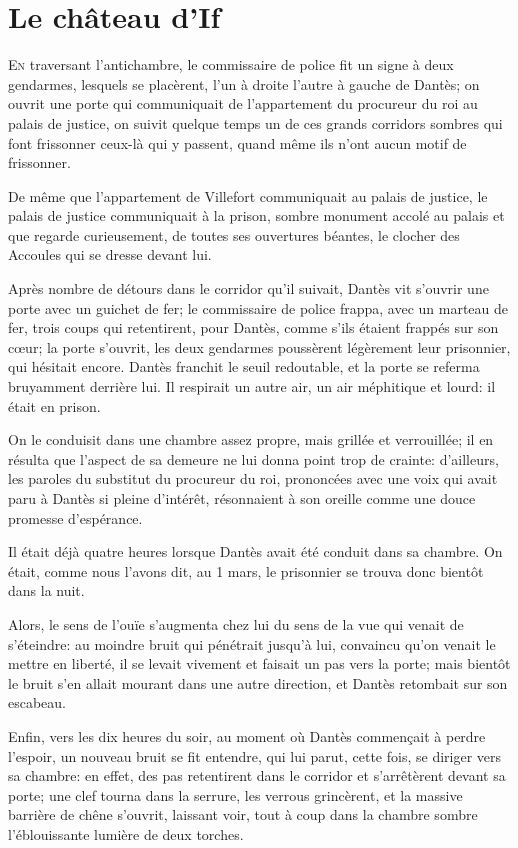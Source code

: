 \chapter{Le château d'If}

\lettrine{E}{n} traversant l'antichambre, le commissaire de police fit un signe à deux gendarmes, lesquels se placèrent, l'un à droite l'autre à gauche de Dantès; on ouvrit une porte qui communiquait de l'appartement du procureur du roi au palais de justice, on suivit quelque temps un de ces grands corridors sombres qui font frissonner ceux-là qui y passent, quand même ils n'ont aucun motif de frissonner.

De même que l'appartement de Villefort communiquait au palais de justice, le palais de justice communiquait à la prison, sombre monument accolé au palais et que regarde curieusement, de toutes ses ouvertures béantes, le clocher des Accoules qui se dresse devant lui.

Après nombre de détours dans le corridor qu'il suivait, Dantès vit s'ouvrir une porte avec un guichet de fer; le commissaire de police frappa, avec un marteau de fer, trois coups qui retentirent, pour Dantès, comme s'ils étaient frappés sur son cœur; la porte s'ouvrit, les deux gendarmes poussèrent légèrement leur prisonnier, qui hésitait encore. Dantès franchit le seuil redoutable, et la porte se referma bruyamment derrière lui. Il respirait un autre air, un air méphitique et lourd: il était en prison.

On le conduisit dans une chambre assez propre, mais grillée et verrouillée; il en résulta que l'aspect de sa demeure ne lui donna point trop de crainte: d'ailleurs, les paroles du substitut du procureur du roi, prononcées avec une voix qui avait paru à Dantès si pleine d'intérêt, résonnaient à son oreille comme une douce promesse d'espérance.

Il était déjà quatre heures lorsque Dantès avait été conduit dans sa chambre. On était, comme nous l'avons dit, au 1\ier{} mars, le prisonnier se trouva donc bientôt dans la nuit.

Alors, le sens de l'ouïe s'augmenta chez lui du sens de la vue qui venait de s'éteindre: au moindre bruit qui pénétrait jusqu'à lui, convaincu qu'on venait le mettre en liberté, il se levait vivement et faisait un pas vers la porte; mais bientôt le bruit s'en allait mourant dans une autre direction, et Dantès retombait sur son escabeau.

Enfin, vers les dix heures du soir, au moment où Dantès commençait à perdre l'espoir, un nouveau bruit se fit entendre, qui lui parut, cette fois, se diriger vers sa chambre: en effet, des pas retentirent dans le corridor et s'arrêtèrent devant sa porte; une clef tourna dans la serrure, les verrous grincèrent, et la massive barrière de chêne s'ouvrit, laissant voir, tout à coup dans la chambre sombre l'éblouissante lumière de deux torches.

